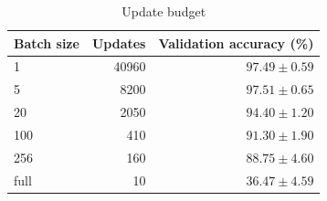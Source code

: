 \begin{table}[htbp]
\centering
\caption{Update budget}
\label{tab:batch}
\small
\begin{tabular}{lrr}
\toprule
Batch size & Updates & Validation accuracy (\%) \\
\midrule
1 & 40960 & $97.49 \pm 0.59$ \\
5 & 8200 & $97.51 \pm 0.65$ \\
20 & 2050 & $94.40 \pm 1.20$ \\
100 & 410 & $91.30 \pm 1.90$ \\
256 & 160 & $88.75 \pm 4.60$ \\
full & 10 & $36.47 \pm 4.59$ \\
\bottomrule
\end{tabular}
\end{table}
